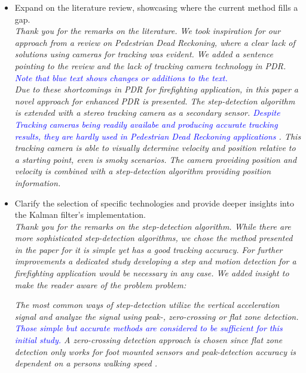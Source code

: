\documentclass{article}
\begin{document}
\begin{itemize}
\item Expand on the literature review, showcasing where the current method fills a gap.\\
\textit{Thank you for the remarks on the literature. We took inspiration for our approach from a review on Pedestrian Dead Reckoning, where a clear lack of solutions using cameras for tracking was evident. We added a sentence pointing to the review and the lack of tracking camera technology in PDR. \textcolor{blue}{Note that blue text shows changes or additions to the text.}}\\


\textit{Due to these shortcomings in PDR for firefighting application, in this paper  a novel approach for enhanced PDR is presented. The step-detection algorithm is extended with a stereo tracking camera as a secondary sensor. \textcolor{blue}{Despite Tracking cameras being readily availabe and producing accurate tracking results, they are hardly used in Pedestrian Dead Reckoning applications \cite{hou2021}}. This tracking camera is able to visually determine velocity and position relative to a starting point, even is smoky scenarios. The camera providing position and velocity is combined with a step-detection algorithm providing position information.}

\item Clarify the selection of specific technologies and provide deeper insights into the Kalman filter's implementation.\\
\textit{Thank you for the remarks on the step-detection algorithm. While there are more sophisticated step-detection algorithms, we chose the method presented in the paper for it is simple yet has a good tracking accuracy. For further improvements a dedicated study developing a step and motion detection for a firefighting application would be necessary in any case. We added insight to make the reader aware of the problem problem:}

\textit{The most common ways of step-detection utilize  the vertical acceleration signal and analyze the signal using peak-, zero-crossing or flat zone detection. \textcolor{blue}{Those simple but accurate methods are considered to be sufficient for this initial study.} A zero-crossing detection approach is chosen since flat zone detection only works for foot mounted sensors and peak-detection accuracy is dependent on a persons walking speed \cite{shin2007}.}\\


\end{itemize}
\end{document}
